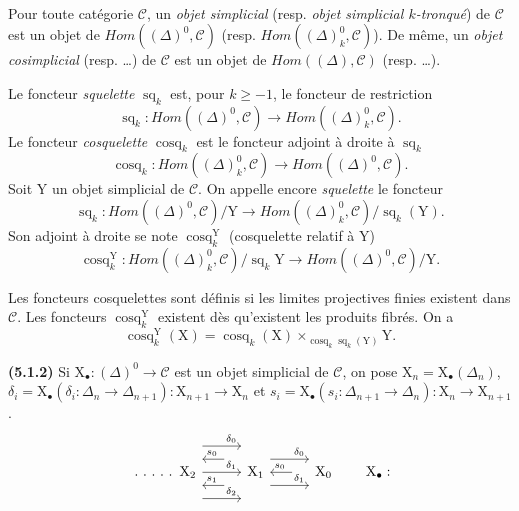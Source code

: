 \documentclass[11pt,leqno]{article}
\newcommand{\Page}[1]{\ifvmode\noindent\else\unskip\ \fi{\footnotesize\textcolor{gray}{[p.\,#1]}}\ \ignorespaces}
\begin{document}
\Page{9}

Pour toute catégorie \(\mathscr{C}\), un \textit{objet simplicial} (resp. \textit{objet simplicial \(k\)-tronqué}) de \(\mathscr{C}\) est un objet de \(\mathit{Hom}((\Delta)^0,\mathscr{C})\) (resp. \(\mathit{Hom}((\Delta)_k^0,\mathscr{C})\)). De même, un \textit{objet cosimplicial} (resp. …) de \(\mathscr{C}\) est un objet de \(\mathit{Hom}((\Delta),\mathscr{C})\) (resp. …).

Le foncteur \textit{squelette} \(\operatorname{sq}_k\) est, pour \(k\geq-1\), le foncteur de restriction
\[
\operatorname{sq}_k:\mathit{Hom}((\Delta)^0,\mathscr{C})
\to\mathit{Hom}((\Delta)_k^0,\mathscr{C}).
\]
Le foncteur \textit{cosquelette} \(\operatorname{cosq}_k\) est le foncteur adjoint à droite à \(\operatorname{sq}_k\)
\[
\operatorname{cosq}_k:\mathit{Hom}((\Delta)_k^0,\mathscr{C})
\to\mathit{Hom}((\Delta)^0,\mathscr{C}).
\]
Soit \(\mathrm{Y}\) un objet simplicial de \(\mathscr{C}\). On appelle encore \textit{squelette} le foncteur
\[
\operatorname{sq}_k:\mathit{Hom}((\Delta)^0,\mathscr{C})/\mathrm{Y}
\to\mathit{Hom}((\Delta)_k^0,\mathscr{C})/\operatorname{sq}_k(\mathrm{Y}).
\]
Son adjoint à droite se note \(\operatorname{cosq}_k^{\mathrm{Y}}\) (cosquelette relatif à \(\mathrm{Y}\))
\[
\operatorname{cosq}_k^{\mathrm{Y}}:
\mathit{Hom}((\Delta)_k^0,\mathscr{C})/\operatorname{sq}_k\mathrm{Y}
\to\mathit{Hom}((\Delta)^0,\mathscr{C})/\mathrm{Y}.
\]

Les foncteurs cosquelettes sont définis si les limites projectives finies existent dans \(\mathscr{C}\). Les foncteurs \(\operatorname{cosq}_k^{\mathrm{Y}}\) existent dès qu’existent les produits fibrés. On a
\[
\operatorname{cosq}_k^{\mathrm{Y}}(\mathrm{X})
=\operatorname{cosq}_k(\mathrm{X})
\times_{\operatorname{cosq}_k\operatorname{sq}_k(\mathrm{Y})}\mathrm{Y}.
\]

\textbf{(5.1.2)} Si \(\mathrm{X}_{\bullet}:(\Delta)^0\to\mathscr{C}\) est un objet simplicial de \(\mathscr{C}\), on pose \(\mathrm{X}_n=\mathrm{X}_{\bullet}(\Delta_n)\), \(\delta_i=\mathrm{X}_{\bullet}(\delta_i:\Delta_n\to\Delta_{n+1}):\mathrm{X}_{n+1}\to\mathrm{X}_n\) et \(s_i=\mathrm{X}_{\bullet}(s_i:\Delta_{n+1}\to\Delta_n):\mathrm{X}_n\to\mathrm{X}_{n+1}\).
\[
\begin{tikzcd}[column sep=2.8em]
\ldotp\,\ldotp\,\ldotp\,\ldotp\,\ldotp\ \mathrm{X}_2
  \arrow[r, shift left=4.4ex, "\delta_0"{near end}]
  \arrow[r, "\delta_1"{near end}]
  \arrow[r, shift right=4.4ex, "\delta_2"{near end}]
&
\mathrm{X}_1
  \arrow[l, shift right=2.2ex, shorten <=1.2em, "s_0"'{near end}]
  \arrow[l, shift left=2.2ex, shorten <=1.2em, "s_1"'{near end}]
  \arrow[r, shift left=2.2ex, "\delta_0"{near end}]
  \arrow[r, shift right=2.2ex, "\delta_1"{near end}]
&
\mathrm{X}_0
  \arrow[l, shorten <=1.2em, "s_0"'{near end}]
\end{tikzcd}
\tag*{\(\mathrm{X}_{\bullet}:\)}
\]
\end{document}
